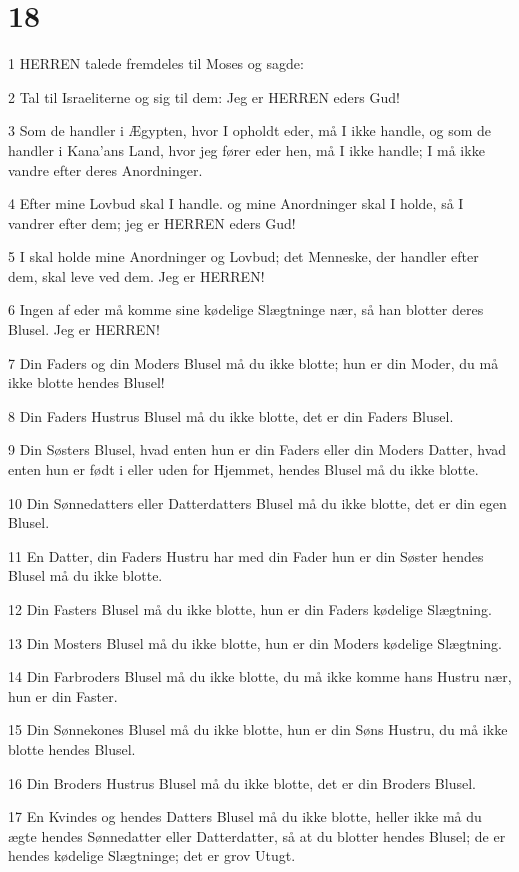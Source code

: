 \chapter{18}

\par 1 HERREN talede fremdeles til Moses og sagde:
\par 2 Tal til Israeliterne og sig til dem: Jeg er HERREN eders Gud!
\par 3 Som de handler i Ægypten, hvor I opholdt eder, må I ikke handle, og som de handler i Kana'ans Land, hvor jeg fører eder hen, må I ikke handle; I må ikke vandre efter deres Anordninger.
\par 4 Efter mine Lovbud skal I handle. og mine Anordninger skal I holde, så I vandrer efter dem; jeg er HERREN eders Gud!
\par 5 I skal holde mine Anordninger og Lovbud; det Menneske, der handler efter dem, skal leve ved dem. Jeg er HERREN!
\par 6 Ingen af eder må komme sine kødelige Slægtninge nær, så han blotter deres Blusel. Jeg er HERREN!
\par 7 Din Faders og din Moders Blusel må du ikke blotte; hun er din Moder, du må ikke blotte hendes Blusel!
\par 8 Din Faders Hustrus Blusel må du ikke blotte, det er din Faders Blusel.
\par 9 Din Søsters Blusel, hvad enten hun er din Faders eller din Moders Datter, hvad enten hun er født i eller uden for Hjemmet, hendes Blusel må du ikke blotte.
\par 10 Din Sønnedatters eller Datterdatters Blusel må du ikke blotte, det er din egen Blusel.
\par 11 En Datter, din Faders Hustru har med din Fader hun er din Søster hendes Blusel må du ikke blotte.
\par 12 Din Fasters Blusel må du ikke blotte, hun er din Faders kødelige Slægtning.
\par 13 Din Mosters Blusel må du ikke blotte, hun er din Moders kødelige Slægtning.
\par 14 Din Farbroders Blusel må du ikke blotte, du må ikke komme hans Hustru nær, hun er din Faster.
\par 15 Din Sønnekones Blusel må du ikke blotte, hun er din Søns Hustru, du må ikke blotte hendes Blusel.
\par 16 Din Broders Hustrus Blusel må du ikke blotte, det er din Broders Blusel.
\par 17 En Kvindes og hendes Datters Blusel må du ikke blotte, heller ikke må du ægte hendes Sønnedatter eller Datterdatter, så at du blotter hendes Blusel; de er hendes kødelige Slægtninge; det er grov Utugt.
